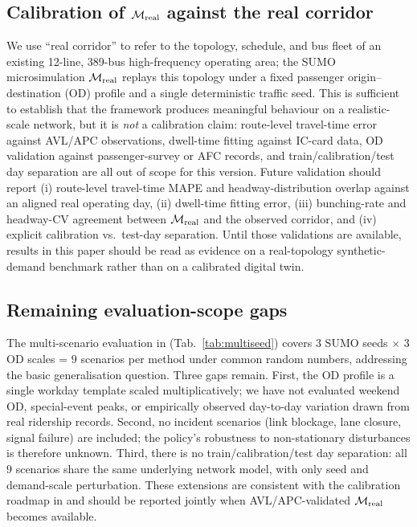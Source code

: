 \subsection[Calibration of the high-fidelity simulator against the real corridor]{Calibration of $\mathcal{M}_{\mathrm{real}}$ against the real corridor}
\label{sec:disc:calibration}

We use ``real corridor'' to refer to the topology, schedule, and bus fleet of an existing 12-line, 389-bus high-frequency operating area; the SUMO microsimulation $\mathcal{M}_{\mathrm{real}}$ replays this topology under a fixed passenger origin--destination (OD) profile and a single deterministic traffic seed.
This is sufficient to establish that the framework produces meaningful behaviour on a realistic-scale network, but it is \emph{not} a calibration claim: route-level travel-time error against AVL/APC observations, dwell-time fitting against IC-card data, OD validation against passenger-survey or AFC records, and train/calibration/test day separation are all out of scope for this version.
Future validation should report (i) route-level travel-time MAPE and headway-distribution overlap against an aligned real operating day, (ii) dwell-time fitting error, (iii) bunching-rate and headway-CV agreement between $\mathcal{M}_{\mathrm{real}}$ and the observed corridor, and (iv) explicit calibration vs.\ test-day separation.
Until those validations are available, results in this paper should be read as evidence on a real-topology synthetic-demand benchmark rather than on a calibrated digital twin.

\subsection{Remaining evaluation-scope gaps}
\label{sec:disc:eval_scope}

The multi-scenario evaluation in  (Tab.~\ref{tab:multiseed}) covers $3$ SUMO seeds $\times$ $3$ OD scales = $9$ scenarios per method under common random numbers, addressing the basic generalisation question.
Three gaps remain.
First, the OD profile is a single workday template scaled multiplicatively; we have not evaluated weekend OD, special-event peaks, or empirically observed day-to-day variation drawn from real ridership records.
Second, no incident scenarios (link blockage, lane closure, signal failure) are included; the policy's robustness to non-stationary disturbances is therefore unknown.
Third, there is no train/calibration/test day separation: all $9$ scenarios share the same underlying network model, with only seed and demand-scale perturbation.
These extensions are consistent with the calibration roadmap in  and should be reported jointly when AVL/APC-validated $\mathcal{M}_{\mathrm{real}}$ becomes available.

